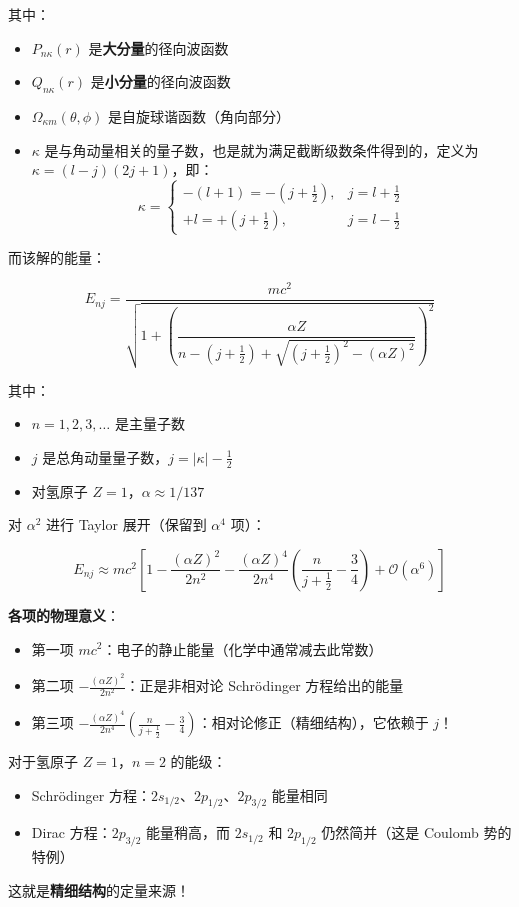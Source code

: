\documentclass[UTF8]{ctexbook}
\begin{document}
其中：
\begin{itemize}
    \item \(P_{n\kappa}(r)\) 是\textbf{大分量}的径向波函数
    \item \(Q_{n\kappa}(r)\) 是\textbf{小分量}的径向波函数
    \item \(\Omega_{\kappa m}(\theta, \phi)\) 是自旋球谐函数（角向部分）
    \item \(\kappa\) 是与角动量相关的量子数，也是就为满足截断级数条件得到的，定义为 \(\kappa = (l-j)(2j+1)\)，即：
    \[
    \kappa = \begin{cases}
        -(l+1) = -(j+\frac{1}{2}), & j = l + \frac{1}{2} \\
        +l = +(j+\frac{1}{2}), & j = l - \frac{1}{2}
    \end{cases}
    \]
\end{itemize}

而该解的能量：

\[
E_{nj} = \frac{m c^2}{\sqrt{1 + \left( \dfrac{\alpha Z}{n - (j+\frac{1}{2}) + \sqrt{(j+\frac{1}{2})^2 - (\alpha Z)^2}} \right)^2 }}
\]

其中：
\begin{itemize}
    \item \(n = 1, 2, 3, \dots\) 是主量子数
    \item \(j\) 是总角动量量子数，\(j = |\kappa| - \frac{1}{2}\)
    \item 对氢原子 \(Z=1\)，\(\alpha \approx 1/137\)
\end{itemize}

对 \(\alpha^2\) 进行 Taylor 展开（保留到 \(\alpha^4\) 项）：

\[
E_{nj} \approx m c^2 \left[ 1 - \frac{(\alpha Z)^2}{2n^2} - \frac{(\alpha Z)^4}{2n^4} \left( \frac{n}{j+\frac{1}{2}} - \frac{3}{4} \right) + \mathcal{O}(\alpha^6) \right]
\]

\textbf{各项的物理意义}：
\begin{itemize}
    \item 第一项 \(m c^2\)：电子的静止能量（化学中通常减去此常数）
    \item 第二项 \(-\frac{(\alpha Z)^2}{2n^2}\)：正是非相对论 Schrödinger 方程给出的能量
    \item 第三项 \(-\frac{(\alpha Z)^4}{2n^4}\left( \frac{n}{j+\frac{1}{2}} - \frac{3}{4} \right)\)：相对论修正（精细结构），它依赖于 \(j\)！
\end{itemize}

对于氢原子 \(Z=1\)，\(n=2\) 的能级：
\begin{itemize}
    \item Schrödinger 方程：\(2s_{1/2}\)、\(2p_{1/2}\)、\(2p_{3/2}\) 能量相同
    \item Dirac 方程：\(2p_{3/2}\) 能量稍高，而 \(2s_{1/2}\) 和 \(2p_{1/2}\) 仍然简并（这是 Coulomb 势的特例）
\end{itemize}

这就是\textbf{精细结构}的定量来源！
\end{document}
